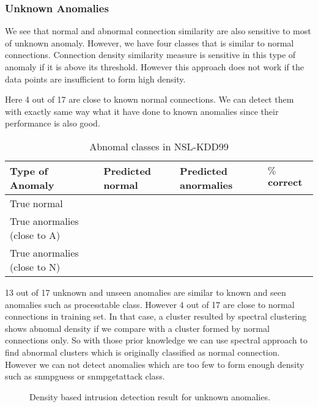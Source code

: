 \subsubsection{Unknown Anomalies}
We see that normal and abnormal connection similarity are also sensitive to most of unknown anomaly. 
However, we have four classes that is similar to normal connections. 
Connection density similarity measure is sensitive in this type of anomaly if it is above its threshold. 
However this approach does not work if the data points are insufficient to form high density.

Here 4 out of 17 are close to known normal connections. 
We can detect them with exactly same way what it have done to known anomalies since their performance is also good. 
\begin{table}[h]
\begin{center}
\begin{tabular}{| l | l | l | p{5cm} |}
\hline
Type of Anomaly & Predicted normal & Predicted anormalies & $\%$ correct\\
\hline
True normal &  &  & \\
\hline
True anormalies (close to A)&  &  & \\
\hline
True anormalies (close to N) &  &  & \\
\hline
\end{tabular}
\end{center}
\caption{Abnomal classes in NSL-KDD99}
\label{fig:refSingleRobot1}
\end{table}

13 out of 17 unknown and unseen anomalies are similar to known and seen anomalies such as processtable class. 
However 4 out of 17 are close to normal connections in training set. 
In that case, a cluster resulted by spectral clustering shows abnomal density if we compare with a cluster formed by normal connections only. 
So with those prior knowledge we can use spectral approach to find abnormal clusters which is originally classified as normal connection. 
However we can not detect anomalies which are too few to form enough density such as snmpguess or snmpgetattack class. 
\begin{figure}[htb2]
\begin{center}
\end{center}
\caption{Density based intrusion detection result for unknown anomalies.} %
\label{fig:refSingleRobot1}
\end{figure}

